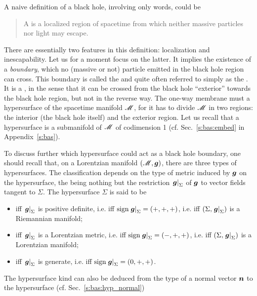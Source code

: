 A naive definition of a black hole, involving only words, could be
\begin{quote}
A  is a localized region of spacetime
from which neither massive particles nor light may escape.
\end{quote}
There are essentially two features in this definition: localization
and inescapability. Let us for a moment focus on the latter.
It implies the existence of a \emph{boundary}, which no
(massive or not) particle emitted in the black hole region can cross.
This boundary is called the
 and
quite often referred to simply as the .
It is a ,
in the sense that it can be crossed from the black hole ``exterior'' towards
the black hole region, but not in the reverse way. The one-way membrane must
a hypersurface of the spacetime manifold $\mathscr{M}$, for it has to divide $\mathscr{M}$ in two regions:
the interior (the black hole itself) and the exterior region.
Let us recall that a hypersurface is a submanifold of $\mathscr{M}$ of codimension 1
(cf. Sec.~\ref{s:bas:embed} in Appendix~\ref{s:bas}).

To discuss further which hypersurface could act as a black hole boundary,
one should recall that, on a Lorentzian manifold $(\mathscr{M},\bm{g})$, there are
three types of hypersurfaces. The classification
depends on the type of metric induced by $\bm{g}$ on the hypersurface, the
 being
nothing but the restriction $\left.\bm{g}\right| _{\Sigma}$ of $\bm{g}$
to vector fields tangent to $\Sigma$.
The hypersurface $\Sigma$ is said to be
\begin{itemize}
\item {} iff $\left.\bm{g}\right| _{\Sigma}$ is positive definite,
i.e. iff $\mathrm{sign} \left.\bm{g}\right| _{\Sigma} = (+,+,+)$,
i.e. iff $(\Sigma,  \left.\bm{g}\right| _{\Sigma})$ is a Riemannian manifold;
\item {} iff $\left.\bm{g}\right| _{\Sigma}$ is a Lorentzian metric,
i.e. iff $\mathrm{sign} \left.\bm{g}\right| _{\Sigma} = (-,+,+)$,
i.e. iff $(\Sigma,  \left.\bm{g}\right| _{\Sigma})$ is a Lorentzian manifold;
\item {} iff $\left.\bm{g}\right| _{\Sigma}$ is generate,
i.e. iff $\mathrm{sign} \left.\bm{g}\right| _{\Sigma} = (0,+,+)$.
\end{itemize}
The hypersurface kind can also be deduced from the type of a normal vector
$\bm{n}$ to the hypersurface (cf. Sec.~\ref{s:bas:hyp_normal})
